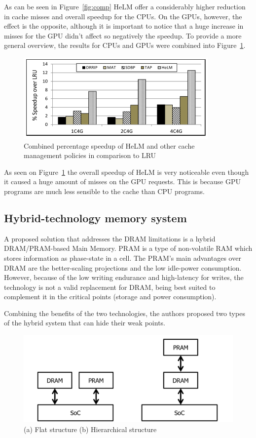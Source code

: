 \documentclass[12pt,journal,compsoc]{IEEEtran}
\begin{document}
As can be seen in Figure~\ref{fig:comp} HeLM offer a considerably higher reduction in cache misses and overall speedup for the CPUs. On the GPUs, however, the effect is the opposite, although it is important to notice that a huge increase in misses for the GPU didn't affect so negatively the speedup. To provide a more general overview, the results for CPUs and GPUs were combined into Figure~\ref{fig:comp1}.


\begin{figure}[H]
	\centering
	\includegraphics[width = 8 cm]{graphics/LLCresults2.png}
	\caption{Combined percentage speedup of HeLM and other cache management policies in comparison to LRU}\label{fig:comp1}
\end{figure} 

As seen on Figure~\ref{fig:comp1} the overall speedup of HeLM is very noticeable even though it caused a huge amount of misses on the GPU requests. This is because GPU programs are much less sensible to the cache than CPU programs.

\subsection{Hybrid-technology memory system}
A proposed solution that addresses the DRAM limitations is a hybrid DRAM/PRAM-based Main Memory. PRAM is a type of non-volatile RAM which stores information as phase-state in a cell. The PRAM’s main advantages over DRAM  are the better-scaling projections and the low idle-power consumption. However, because of the low writing endurance and high-latency for writes, the technology is not a valid replacement for DRAM, being best suited to complement it in the critical points (storage and power consumption).

Combining the benefits of the two technologies, the authors proposed two types of the hybrid system that can hide their weak points. 

\begin{figure}[H]
	\centering
	\includegraphics[width = 8 cm]{graphics/structure-hybrid.png}
	\caption{(a) Flat structure (b) Hierarchical structure}\label{fig:buff}
\end{figure} 
\end{document}
